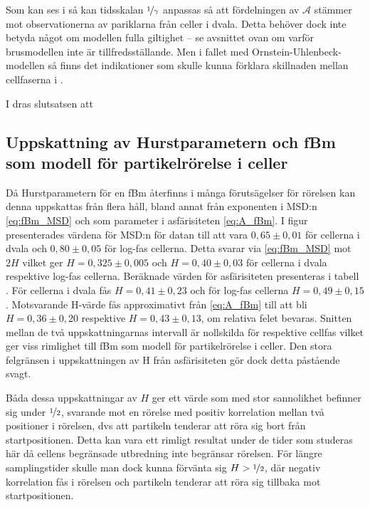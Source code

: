 Som kan ses i  så kan tidsskalan $\nicefrac{1}{\gamma}$ anpassas så att fördelningen av $\mathcal{A}$ stämmer mot observationerna av pariklarna från celler i dvala. Detta behöver dock inte betyda något om modellen fulla giltighet -- se avsnittet ovan om varför brusmodellen inte är tillfredsställande. Men i fallet med Ornstein-Uhlenbeck-modellen så finns det indikationer som skulle kunna förklara skillnaden mellan cellfaserna i .

I \cite{Midtveldt_etal2016} dras slutsatsen att 



\subsection{Uppskattning av Hurstparametern och fBm som modell för partikelrörelse i celler}

Då Hurstparametern för en fBm återfinns i många förutsägelser för rörelsen kan denna uppskattas från flera håll, bland annat från exponenten i MSD:n \eqref{eq:fBm_MSD} och som parameter i asfärisiteten \eqref{eq:A_fBm}. 
I figur  presenterades värdena för MSD:n för datan till att vara $0,65\pm0,01$ för cellerna i dvala och $0,80\pm0,05$ för log-fas cellerna. Detta svarar via \eqref{eq:fBm_MSD} mot $2H$ vilket ger $H=0,325\pm0,005$ och $H=0,40\pm0,03$ för cellerna i dvala respektive log-fas cellerna.
Beräknade värden för asfärisiteten presenteras i tabell . För cellerna i dvala fås $H=0,41\pm 0,23$ och för log-fas cellerna $H=0,49\pm 0,15$. Motsvarande H-värde fås approximativt från \eqref{eq:A_fBm} till att bli $H=0,36\pm0,20$ respektive $H=0,43\pm0,13$, om relativa felet bevaras. Snitten mellan de två uppskattningarnas intervall är nollskilda för respektive cellfas vilket ger viss rimlighet till fBm som modell för partikelrörelse i celler. Den stora felgränsen i uppskattningen av H från asfärisiteten gör dock detta påstående svagt.

Båda dessa uppskattningar av $H$ ger ett värde som med stor sannolikhet befinner sig under $\nicefrac{1}{2}$, svarande mot en rörelse med positiv korrelation mellan två positioner i rörelsen, dvs att partikeln tenderar att röra sig bort från startpositionen. Detta kan vara ett rimligt resultat under de tider som studeras här då cellens begränsade utbredning inte begränsar rörelsen. För längre samplingstider skulle man dock kunna förvänta sig $H>\nicefrac{1}{2}$, där negativ korrelation fås i rörelsen och partikeln tenderar att röra sig tillbaka mot startpositionen. 

